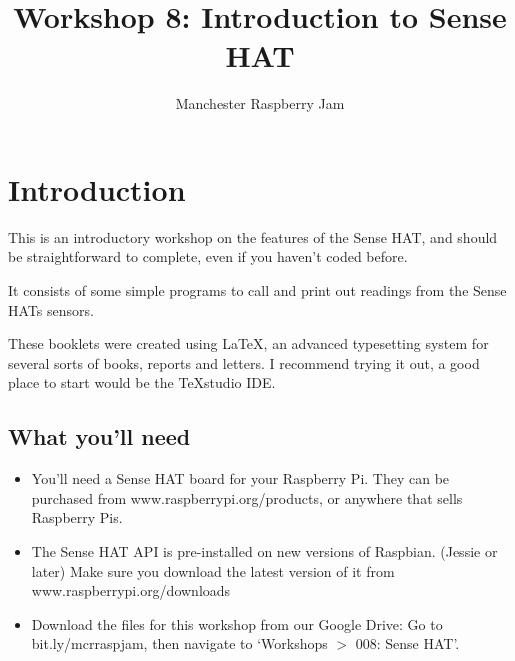 \documentclass[a4paper, twocolumn, twoside, 12pt]{article}
\begin{document}
	\author{Manchester Raspberry Jam}
	\title{Workshop 8: Introduction to Sense HAT}
	\date{}

	\maketitle
	
	\setcounter{tocdepth}{1}
	\tableofcontents
	
\setcounter{section}{-1}
	\section{Introduction}
		This is an introductory workshop on the features of the Sense HAT, and should be straightforward to complete, even if you haven't coded before.
		
		It consists of some simple programs to call and print out readings from the Sense HATs sensors.
		
		These booklets were created using {\selectfont \LaTeX}, an advanced typesetting system for several sorts of books, reports and letters. I recommend trying it out, a good place to start would be the \TeX studio IDE.
	
	\subsection*{What you'll need}
		\begin{itemize}
			\item You'll need a Sense HAT board for your Raspberry Pi.
			\scriptsize\newline They can be purchased from \color{WildStrawberry}www.raspberrypi.org/products\color{black}, or anywhere that sells Raspberry Pis.
			\normalsize
			
			\item The Sense HAT API is pre-installed on new versions of Raspbian. (Jessie or later) 			
			\scriptsize\newline Make sure you download the latest version of it from \color{WildStrawberry}www.raspberrypi.org/downloads\color{black}
			\normalsize
			
			\item Download the files for this workshop from our Google Drive:
			\scriptsize\newline Go to \color{WildStrawberry}bit.ly/mcrraspjam\color{black}, then navigate to `Workshops $>$ 008: Sense HAT'.
			\normalsize
		\end{itemize}
	
\end{document}
